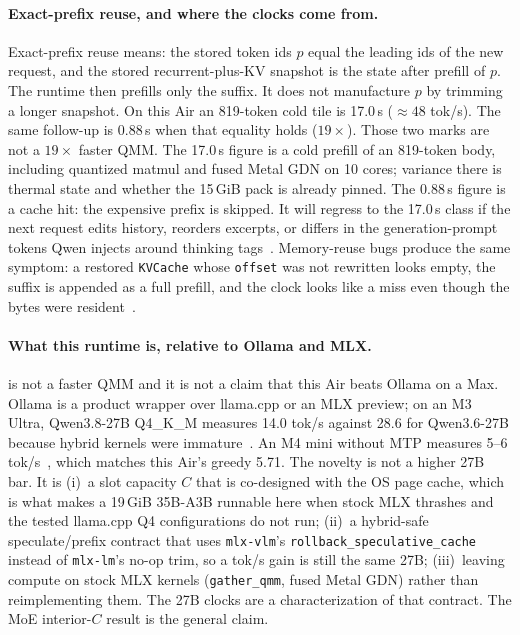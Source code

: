 \paragraph{Exact-prefix reuse, and where the clocks come from.}
Exact-prefix reuse means: the stored token ids $p$ equal the leading ids of the new request, and the stored recurrent-plus-KV snapshot is the state after prefill of $p$. The runtime then prefills only the suffix. It does not manufacture $p$ by trimming a longer snapshot. On this Air an 819-token cold tile is 17.0\,s (${\approx}48$ tok/s). The same follow-up is 0.88\,s when that equality holds ($19{\times}$). Those two marks are not a $19{\times}$ faster QMM. The 17.0\,s figure is a cold prefill of an 819-token body, including quantized matmul and fused Metal GDN on 10 cores; variance there is thermal state and whether the 15\,GiB pack is already pinned. The 0.88\,s figure is a cache hit: the expensive prefix is skipped. It will regress to the 17.0\,s class if the next request edits history, reorders excerpts, or differs in the generation-prompt tokens Qwen injects around thinking tags~\citep{qwen31826}. Memory-reuse bugs produce the same symptom: a restored \texttt{KVCache} whose \texttt{offset} was not rewritten looks empty, the suffix is appended as a full prefill, and the clock looks like a miss even though the bytes were resident~\citep{mlxlm1162}.

\paragraph{What this runtime is, relative to Ollama and MLX.}
\slotbank{} is not a faster QMM and it is not a claim that this Air beats Ollama on a Max. Ollama is a product wrapper over llama.cpp or an MLX preview; on an M3 Ultra, Qwen3.8-27B Q4\_K\_M measures 14.0 tok/s against 28.6 for Qwen3.6-27B because hybrid kernels were immature~\citep{terminalbytes2026,ollama019}. An M4 mini without MTP measures 5--6 tok/s~\citep{orcarouter2026}, which matches this Air’s greedy 5.71. The novelty is not a higher 27B bar. It is (i)~a slot capacity $C$ that is co-designed with the OS page cache, which is what makes a 19\,GiB 35B-A3B runnable here when stock MLX thrashes and the tested llama.cpp Q4 configurations do not run; (ii)~a hybrid-safe speculate/prefix contract that uses \texttt{mlx-vlm}’s \texttt{rollback\_speculative\_cache} instead of \texttt{mlx-lm}’s no-op trim, so a tok/s gain is still the same 27B; (iii)~leaving compute on stock MLX kernels (\texttt{gather\_qmm}, fused Metal GDN) rather than reimplementing them. The 27B clocks are a characterization of that contract. The MoE interior-$C$ result is the general claim.

